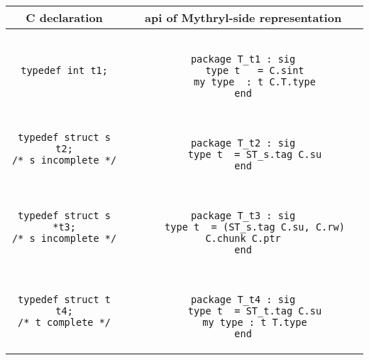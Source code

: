 \begin{small}
\begin{center}
\begin{tabular}{c|c}
C declaration & api of Mythryl-side representation \\ \hline\hline
\begin{minipage}{2in}
\begin{verbatim}
typedef int t1;
\end{verbatim}
\end{minipage}
&
\begin{minipage}{4in}
\begin{verbatim}

package T_t1 : sig
    type t   = C.sint
    my type  : t C.T.type
end

\end{verbatim}
\end{minipage}
\\ \hline
\begin{minipage}{2in}
\begin{verbatim}
typedef struct s t2;
/* s incomplete */
\end{verbatim}
\end{minipage}
&
\begin{minipage}{4in}
\begin{verbatim}

package T_t2 : sig
    type t  = ST_s.tag C.su
end

\end{verbatim}
\end{minipage}
\\ \hline
\begin{minipage}{2in}
\begin{verbatim}
typedef struct s *t3;
/* s incomplete */
\end{verbatim}
\end{minipage}
&
\begin{minipage}{4in}
\begin{verbatim}

package T_t3 : sig
    type t  = (ST_s.tag C.su, C.rw) C.chunk C.ptr
end

\end{verbatim}
\end{minipage}
\\ \hline
\begin{minipage}{2in}
\begin{verbatim}
typedef struct t t4;
/* t complete */
\end{verbatim}
\end{minipage}
&
\begin{minipage}{4in}
\begin{verbatim}

package T_t4 : sig
    type t  = ST_t.tag C.su
    my type : t T.type
end

\end{verbatim}
\end{minipage}
\end{tabular}
\end{center}
\end{small}

